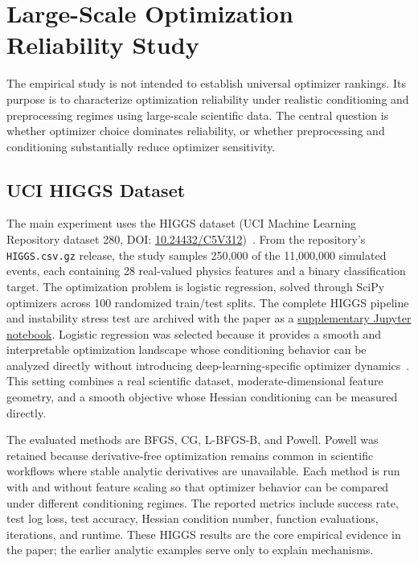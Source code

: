 \section{Large-Scale Optimization Reliability Study}
\label{sec:higgs-reliability}

The empirical study is not intended to establish universal optimizer rankings. Its purpose is to characterize optimization reliability under realistic conditioning and preprocessing regimes using large-scale scientific data. The central question is whether optimizer choice dominates reliability, or whether preprocessing and conditioning substantially reduce optimizer sensitivity.

\subsection{UCI HIGGS Dataset}

The main experiment uses the HIGGS dataset (UCI Machine Learning Repository dataset 280, DOI: \href{https://doi.org/10.24432/C5V312}{10.24432/C5V312})~\citep{higgs}. From the repository's \texttt{HIGGS.csv.gz} release, the study samples 250,000 of the 11,000,000 simulated events, each containing 28 real-valued physics features and a binary classification target. The optimization problem is logistic regression, solved through SciPy optimizers across 100 randomized train/test splits. The complete HIGGS pipeline and instability stress test are archived with the paper as a \href{numoptimization.ipynb}{supplementary Jupyter notebook}. Logistic regression was selected because it provides a smooth and interpretable optimization landscape whose conditioning behavior can be analyzed directly without introducing deep-learning-specific optimizer dynamics~\citep{boyd}. This setting combines a real scientific dataset, moderate-dimensional feature geometry, and a smooth objective whose Hessian conditioning can be measured directly.

The evaluated methods are BFGS, CG, L-BFGS-B, and Powell. Powell was retained because derivative-free optimization remains common in scientific workflows where stable analytic derivatives are unavailable. Each method is run with and without feature scaling so that optimizer behavior can be compared under different conditioning regimes. The reported metrics include success rate, test log loss, test accuracy, Hessian condition number, function evaluations, iterations, and runtime. These HIGGS results are the core empirical evidence in the paper; the earlier analytic examples serve only to explain mechanisms.

